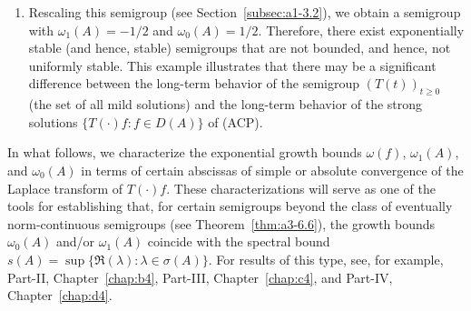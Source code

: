 \begin{example}
\begin{enumerate}[\upshape (i), wide, labelindent=.25em]
To see this, consider $E \coloneqq C_0(\R_{+}) \cap $ $L^{1}(\R_{+},\eu^{x}\dx)$. 
Then, as shown in Example~\ref{ex:a3-1.3} 
the translation semigroup satisfies $\norm{T(t)} = 1$, and hence $\omega_{0}(A) = 0$. 
For every $\lambda \in \C$ with $\Re(\lambda) > -1$ and every $f \in E$, the resolvent of the generator is given as $R(\lambda,A)f = \int_{0}^{\infty} \eu^{\lambda t} T(t)f  \dt$.
From the Eq.~, it follows that
\[
T(t)f = \eu^{\lambda t}\left(f - \int_{0}^{t} \eu^{-\lambda s} T(s) (\lambda - A)f  \ds\right),
\]
and from the existence of the limit
\[
\lim_{t \to \infty} \int_{0}^{t} \eu^{-\lambda s} T(s) (\lambda - A)f  \ds,
\] 
it follows that 
$\norm{T(t)f} \leq M\eu^{\lambda t}$ for every $f \in D(A)$ and some constant $M$ depending on $f$. This yields $\omega_{1}(A) \le -1 < 0 = \omega_{0}(A)$. 
Thus, we have a semigroup that is exponentially stable, but not uniformly exponentially stable.

\item
Rescaling this semigroup (see Section~\ref{subsec:a1-3.2}), we obtain a semigroup with $\omega_{1}(A) = -1/2 $ and $\omega_{0}(A) = 1/2 $.
Therefore, there exist exponentially stable (and hence, stable) semigroups that are not bounded, and hence, not uniformly stable.
This example illustrates that there may be a significant difference between the long-term behavior of the semigroup $(T(t))_{t \geq 0}$ (\ie the set of all mild solutions) and the long-term behavior of the strong solutions $\{T(\cdot)f \colon f \in D(A)\}$ of (ACP). 
\end{enumerate}
\end{example}
In what follows, we characterize the exponential growth bounds $\omega(f)$, $\omega_{1}(A)$, and $\omega_{0}(A)$ in terms of certain abscissas of simple or absolute convergence of the Laplace transform of\/ $T(\cdot)f$. 
These characterizations will serve as one of the tools for 
establishing that, for certain semigroups beyond the class of eventually norm-continuous semigroups (see Theorem~\ref{thm:a3-6.6}), the growth bounds $\omega_{0}(A)$ and/or $\omega_{1}(A)$ coincide with the spectral bound $s(A) = \sup\{\Re(\lambda)\colon\lambda \in \sigma(A)\}$. For results of this type, see, for example, Part-II, Chapter~\ref{chap:b4},  Part-III, Chapter~\ref{chap:c4},  and Part-IV, Chapter~\ref{chap:d4}.


